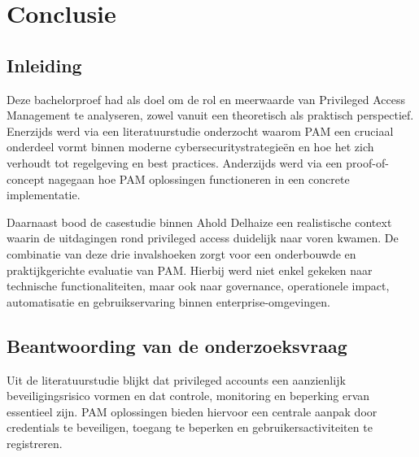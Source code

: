
\chapter{Conclusie}%
\label{ch:conclusie}


\section{Inleiding}
Deze bachelorproef had als doel om de rol en meerwaarde van Privileged Access Management te analyseren, zowel vanuit een theoretisch als praktisch perspectief. Enerzijds werd via een literatuurstudie onderzocht waarom PAM een cruciaal onderdeel vormt binnen moderne cybersecuritystrategieën en hoe het zich verhoudt tot regelgeving en best practices. Anderzijds werd via een proof-of-concept nagegaan hoe PAM oplossingen functioneren in een concrete implementatie.

Daarnaast bood de casestudie binnen Ahold Delhaize een realistische context waarin de uitdagingen rond privileged access duidelijk naar voren kwamen. De combinatie van deze drie invalshoeken zorgt voor een onderbouwde en praktijkgerichte evaluatie van PAM. Hierbij werd niet enkel gekeken naar technische functionaliteiten, maar ook naar governance, operationele impact, automatisatie en gebruikservaring binnen enterprise-omgevingen.
\section{Beantwoording van de onderzoeksvraag}
Uit de literatuurstudie blijkt dat privileged accounts een aanzienlijk beveiligingsrisico vormen en dat controle, monitoring en beperking ervan essentieel zijn. PAM oplossingen bieden hiervoor een centrale aanpak door credentials te beveiligen, toegang te beperken en gebruikersactiviteiten te registreren.

